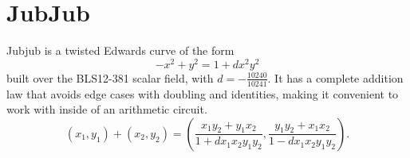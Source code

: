 \documentclass[a4paper]{article}
\newtheorem{thm}{Theorem}
\begin{document}
\section{JubJub}
Jubjub is a twisted Edwards curve of the form 
$$-x^2+y^2=1+dx^2y^2$$
built over the BLS12-381 scalar field, with $d=-\frac{10240}{10241}$. It has a complete addition law that avoids edge cases with doubling and identities, making it convenient to work with inside of an arithmetic circuit.
$$(x_1,y_1)+(x_2,y_2)=\left(\frac{x_1y_2+y_1x_2}{1+dx_1x_2y_1y_2},\frac{y_1y_2+x_1x_2}{1-dx_1x_2y_1y_2} \right).$$








\end{document}
